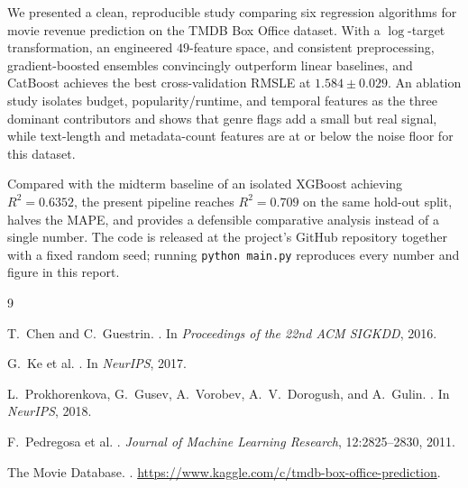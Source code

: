 \documentclass[10pt,a4paper]{article}
\begin{document}
We presented a clean, reproducible study comparing six regression algorithms
for movie revenue prediction on the TMDB Box Office dataset. With a $\log$-target
transformation, an engineered $49$-feature space, and consistent preprocessing,
gradient-boosted ensembles convincingly outperform linear baselines, and
CatBoost achieves the best cross-validation RMSLE at $1.584{\pm}0.029$. An
ablation study isolates budget, popularity/runtime, and temporal features as the
three dominant contributors and shows that genre flags add a small but real
signal, while text-length and metadata-count features are at or below the
noise floor for this dataset.

Compared with the midterm baseline of an isolated XGBoost achieving
$R^{2}=0.6352$, the present pipeline reaches $R^{2}=0.709$ on the same hold-out
split, halves the MAPE, and provides a defensible comparative analysis instead
of a single number. The code is released at the project's GitHub repository
together with a fixed random seed; running \texttt{python main.py} reproduces
every number and figure in this report.

\begin{thebibliography}{9}

T.~Chen and C.~Guestrin.
.
\newblock In \emph{Proceedings of the 22nd ACM SIGKDD}, 2016.

G.~Ke et al.
.
\newblock In \emph{NeurIPS}, 2017.

L.~Prokhorenkova, G.~Gusev, A.~Vorobev, A.~V.~Dorogush, and A.~Gulin.
.
\newblock In \emph{NeurIPS}, 2018.

F.~Pedregosa et al.
.
\newblock \emph{Journal of Machine Learning Research}, 12:2825--2830, 2011.

The Movie Database.
.
\newblock \url{https://www.kaggle.com/c/tmdb-box-office-prediction}.

\end{thebibliography}
\end{document}

